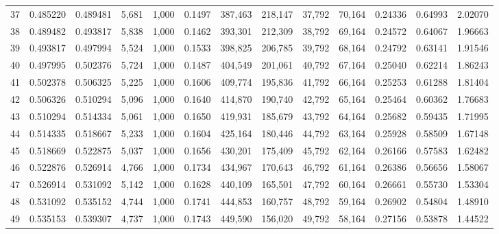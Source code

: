 \begin{tabular}{rrrrrrrrrrrrr}
37  &  0.485220 &  0.489481 &   5,681 &  1,000 &                                     0.1497 &  387,463 &  218,147 &   37,792 &   70,164 &  0.24336 &  0.64993 &  2.02070 \\
38  &  0.489482 &  0.493817 &   5,838 &  1,000 &                                     0.1462 &  393,301 &  212,309 &   38,792 &   69,164 &  0.24572 &  0.64067 &  1.96663 \\
39  &  0.493817 &  0.497994 &   5,524 &  1,000 &                                     0.1533 &  398,825 &  206,785 &   39,792 &   68,164 &  0.24792 &  0.63141 &  1.91546 \\
40  &  0.497995 &  0.502376 &   5,724 &  1,000 &                                     0.1487 &  404,549 &  201,061 &   40,792 &   67,164 &  0.25040 &  0.62214 &  1.86243 \\
41  &  0.502378 &  0.506325 &   5,225 &  1,000 &                                     0.1606 &  409,774 &  195,836 &   41,792 &   66,164 &  0.25253 &  0.61288 &  1.81404 \\
42  &  0.506326 &  0.510294 &   5,096 &  1,000 &                                     0.1640 &  414,870 &  190,740 &   42,792 &   65,164 &  0.25464 &  0.60362 &  1.76683 \\
43  &  0.510294 &  0.514334 &   5,061 &  1,000 &                                     0.1650 &  419,931 &  185,679 &   43,792 &   64,164 &  0.25682 &  0.59435 &  1.71995 \\
44  &  0.514335 &  0.518667 &   5,233 &  1,000 &                                     0.1604 &  425,164 &  180,446 &   44,792 &   63,164 &  0.25928 &  0.58509 &  1.67148 \\
45  &  0.518669 &  0.522875 &   5,037 &  1,000 &                                     0.1656 &  430,201 &  175,409 &   45,792 &   62,164 &  0.26166 &  0.57583 &  1.62482 \\
46  &  0.522876 &  0.526914 &   4,766 &  1,000 &                                     0.1734 &  434,967 &  170,643 &   46,792 &   61,164 &  0.26386 &  0.56656 &  1.58067 \\
47  &  0.526914 &  0.531092 &   5,142 &  1,000 &                                     0.1628 &  440,109 &  165,501 &   47,792 &   60,164 &  0.26661 &  0.55730 &  1.53304 \\
48  &  0.531092 &  0.535152 &   4,744 &  1,000 &                                     0.1741 &  444,853 &  160,757 &   48,792 &   59,164 &  0.26902 &  0.54804 &  1.48910 \\
49  &  0.535153 &  0.539307 &   4,737 &  1,000 &                                     0.1743 &  449,590 &  156,020 &   49,792 &   58,164 &  0.27156 &  0.53878 &  1.44522 \\

\end{tabular}

